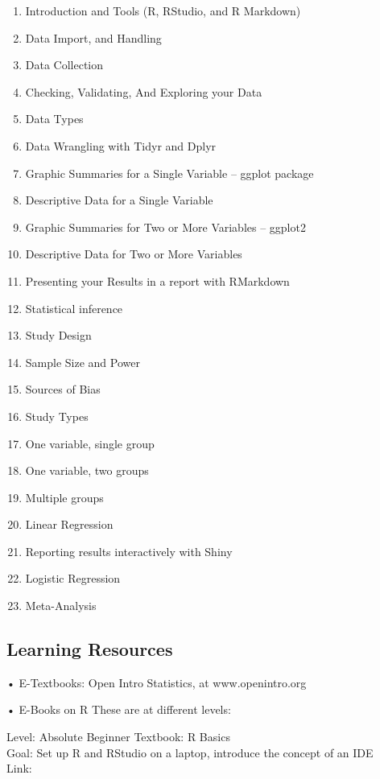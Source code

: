 \documentclass[
]{book}
\providecommand{\tightlist}{%
  \setlength{\itemsep}{0pt}\setlength{\parskip}{0pt}}
\begin{document}
\begin{enumerate}
\def\labelenumi{\arabic{enumi}.}
\tightlist
\item
  Introduction and Tools (R, RStudio, and R Markdown)
\item
  Data Import, and Handling
\item
  Data Collection
\item
  Checking, Validating, And Exploring your Data
\item
  Data Types
\item
  Data Wrangling with Tidyr and Dplyr
\item
  Graphic Summaries for a Single Variable -- ggplot package
\item
  Descriptive Data for a Single Variable
\item
  Graphic Summaries for Two or More Variables -- ggplot2
\item
  Descriptive Data for Two or More Variables
\item
  Presenting your Results in a report with RMarkdown
\item
  Statistical inference
\item
  Study Design
\item
  Sample Size and Power
\item
  Sources of Bias
\item
  Study Types
\item
  One variable, single group
\item
  One variable, two groups
\item
  Multiple groups
\item
  Linear Regression
\item
  Reporting results interactively with Shiny
\item
  Logistic Regression
\item
  Meta-Analysis
\end{enumerate}

\hypertarget{learning-resources}{%
\subsection{Learning Resources}\label{learning-resources}}

• E-Textbooks:
Open Intro Statistics, at www.openintro.org

• E-Books on R
These are at different levels:

Level: Absolute Beginner
Textbook: R Basics\\
Goal: Set up R and RStudio on a laptop, introduce the concept of an IDE\\
Link:
\end{document}
